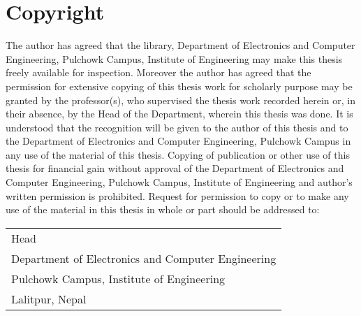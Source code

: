 \chapter*{Copyright}
\doublespacing

The author has agreed that the library, Department of Electronics and Computer Engineering, Pulchowk Campus, Institute of Engineering may make this thesis freely available for inspection. Moreover the author has agreed that the permission for extensive copying of this thesis work for scholarly purpose may be granted by the professor(s), who supervised the thesis work recorded herein or, in their absence, by the Head of the Department, wherein this thesis was done. It is understood that the recognition will be given to the author of this thesis and to the Department of Electronics and Computer Engineering, Pulchowk Campus in any use of the material of this thesis. Copying of publication or other use of this thesis for financial gain without approval of the Department of Electronics and Computer Engineering, Pulchowk Campus, Institute of Engineering and author’s written permission is prohibited. Request for permission to copy or to make any use of the material in this thesis in whole or part should be addressed to:

{\vspace{3cm}}
\begin{tabular}{l}
\hline 
Head \\
Department of Electronics and Computer Engineering \\
Pulchowk Campus, Institute of Engineering \\
Lalitpur, Nepal\\

\end{tabular}

\iffalse
Head

Department of Electronics and Computer Engineering

Institute of Engineering, Pulchowk Campus

Lalitpur, Nepal

\fi
